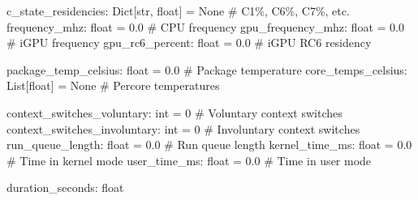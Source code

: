 \documentclass[letterpaper,10pt,english]{sphinxmanual}
\begin{document}
\begin{fulllineitems}
\begin{description}
\sphinxAtStartPar
c\_state\_residencies: Dict{[}str, float{]} = None  \# C1\%, C6\%, C7\%, etc.
frequency\_mhz: float = 0.0                     \# CPU frequency
gpu\_frequency\_mhz: float = 0.0                  \# iGPU frequency
gpu\_rc6\_percent: float = 0.0                     \# iGPU RC6 residency

\sphinxAtStartPar
package\_temp\_celsius: float = 0.0                \# Package temperature
core\_temps\_celsius: List{[}float{]} = None           \# Per\sphinxhyphen{}core temperatures

\sphinxAtStartPar
context\_switches\_voluntary: int = 0              \# Voluntary context switches
context\_switches\_involuntary: int = 0            \# Involuntary context switches
run\_queue\_length: float = 0.0                     \# Run queue length
kernel\_time\_ms: float = 0.0                       \# Time in kernel mode
user\_time\_ms: float = 0.0                         \# Time in user mode

\sphinxAtStartPar
duration\_seconds: float

\end{description}

\begin{fulllineitems}
\label{\detokenize{core.models.derived_energy_measurement:core.models.derived_energy_measurement.DerivedEnergyMeasurement.baseline_id}}
\pysigstartsignatures
\pysigline
{}
\pysigstopsignatures
\end{fulllineitems}


\begin{fulllineitems}
\label{\detokenize{core.models.derived_energy_measurement:core.models.derived_energy_measurement.DerivedEnergyMeasurement.c2_ticks}}
\pysigstartsignatures
\pysigline
{}
\pysigstopsignatures
\end{fulllineitems}


\end{fulllineitems}
\end{document}
